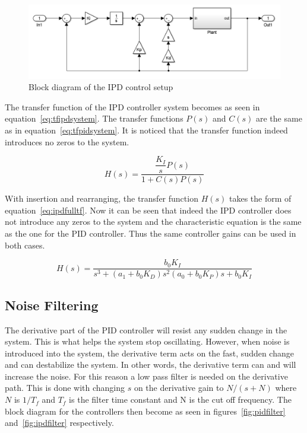\begin{figure}[!h]
	\centering
	\includegraphics[width=1\linewidth]{graphics/ipdcontroller}
	\caption{Block diagram of the IPD control setup}
	\label{fig:ipdcontrolsystem}	
\end{figure}

The transfer function of the IPD controller system becomes as seen in equation~\ref{eq:tfipdsystem}. The transfer functions $P(s)$ and $C(s)$ are the same as in equation~\ref{eq:tfpidsystem}. It is noticed that the transfer function indeed introduces no zeros to the system.

\begin{equation}
\label{eq:tfipdsystem}
H(s) = \dfrac{\dfrac{K_I}{s} P(s)}{1+C(s)P(s)}
\end{equation}

With insertion and rearranging, the transfer function $H(s)$ takes the form of equation~\ref{eq:ipdfulltf}. Now it can be seen that indeed the IPD controller does not introduce any zeros to the system and the characteristic equation is the same as the one for the PID controller. Thus the same controller gains can be used in both cases.

\begin{equation}
\label{eq:ipdfulltf}
H(s) = \dfrac{b_0 K_I}{s^3 + (a_1 + b_0 K_D)s^2 (a_0 + b_0 K_P)s + b_0 K_I }
\end{equation}

\subsection{Noise Filtering}

The derivative part of the PID controller will resist any sudden change in the system. This is what helps the system stop oscillating. However, when noise is introduced into the system, the derivative term acts on the fast, sudden change and can destabilize the system. In other words, the derivative term can and will increase the noise. For this reason a low pass filter is needed on the derivative path. This is done with changing $s$ on the derivative gain to $N/(s + N)$ where $N$ is $1/T_f$ and $T_f$ is the filter time constant and N is the cut off frequency. The block diagram for the controllers then become as seen in figures~\ref{fig:pidfilter} and~\ref{fig:ipdfilter} respectively.

